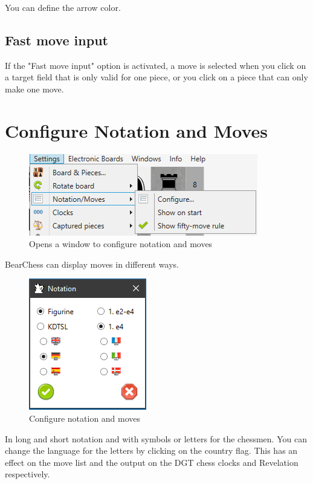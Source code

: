 \documentclass[11pt,a4paper]{article}
\begin{document}
	You can define the arrow color.
	
	\subsection{Fast move input}
	If the "Fast move input" option is activated, a move is selected when you click on a target field that is only valid for one piece, or you click on a piece that can only make one move.
	
	
	\section{Configure Notation and Moves}
	\begin{figure}[H]
		\centering
		\includegraphics[scale=0.9]{NotationAndMoves1.png}
		\caption{Opens a window to configure notation and moves }
		\label{fig:NotationAndMoves}
	\end{figure}
	BearChess can display moves in different ways.
	\begin{figure}[H]
		\centering
		\includegraphics[scale=1.0]{NotationAndMoves2.png}
		\caption{Configure notation and moves }
		\label{fig:NotationAndMoves2}
	\end{figure}
	In long and short notation and with symbols or letters for the chessmen.
	You can change the language for the letters by clicking on the country flag.
	This has an effect on the move list and the output on the DGT chess clocks and Revelation respectively.
	
\end{document}
